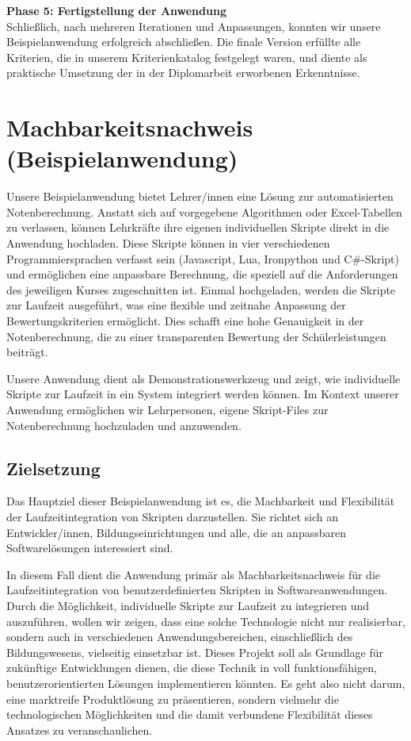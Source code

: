 \textbf{Phase 5: Fertigstellung der Anwendung}\\
Schließlich, nach mehreren Iterationen und Anpassungen, konnten wir unsere Beispielanwendung 
erfolgreich abschließen. Die finale Version erfüllte alle Kriterien, die in 
unserem Kriterienkatalog festgelegt waren, und diente als praktische Umsetzung 
der in der Diplomarbeit erworbenen Erkenntnisse.


\newpage
\section{Machbarkeitsnachweis (Beispielanwendung)}

Unsere Beispielanwendung bietet Lehrer/innen eine Lösung zur automatisierten Notenberechnung. 
Anstatt sich auf vorgegebene Algorithmen oder Excel-Tabellen zu verlassen, 
können Lehrkräfte ihre eigenen individuellen Skripte direkt in die Anwendung hochladen. 
Diese Skripte können in vier verschiedenen Programmiersprachen verfasst sein 
(Javascript, Lua, Ironpython und C\#-Skript) und ermöglichen eine anpassbare Berechnung, 
die speziell auf die Anforderungen des jeweiligen Kurses zugeschnitten ist. Einmal hochgeladen, 
werden die Skripte zur Laufzeit ausgeführt, was eine flexible und zeitnahe Anpassung der 
Bewertungskriterien ermöglicht. Dies schafft eine hohe Genauigkeit in der Notenberechnung, 
die zu einer transparenten Bewertung der Schülerleistungen beiträgt.

Unsere Anwendung dient als Demonstrationswerkzeug und zeigt, wie individuelle Skripte zur 
Laufzeit in ein System integriert werden können. Im Kontext unserer Anwendung ermöglichen wir 
Lehrpersonen, eigene Skript-Files zur Notenberechnung hochzuladen und anzuwenden.

\subsection*{Zielsetzung}
Das Hauptziel dieser Beispielanwendung ist es, die Machbarkeit und Flexibilität der 
Laufzeitintegration von Skripten darzustellen. Sie richtet sich an Entwickler/innen, 
Bildungseinrichtungen und alle, die an anpassbaren Softwarelösungen interessiert sind.

In diesem Fall dient die Anwendung primär als Machbarkeitsnachweis für die Laufzeitintegration 
von benutzerdefinierten Skripten in Softwareanwendungen. Durch die Möglichkeit, individuelle 
Skripte zur Laufzeit zu integrieren und auszuführen, wollen wir zeigen, dass eine solche 
Technologie nicht nur realisierbar, sondern auch in verschiedenen Anwendungsbereichen, 
einschließlich des Bildungswesens, vielseitig einsetzbar ist. Dieses Projekt soll als 
Grundlage für zukünftige Entwicklungen dienen, die diese Technik in voll funktionsfähigen, 
benutzerorientierten Lösungen implementieren könnten. Es geht also nicht darum, 
eine marktreife Produktlösung zu präsentieren, sondern vielmehr die technologischen 
Möglichkeiten und die damit verbundene Flexibilität dieses Ansatzes zu veranschaulichen.


